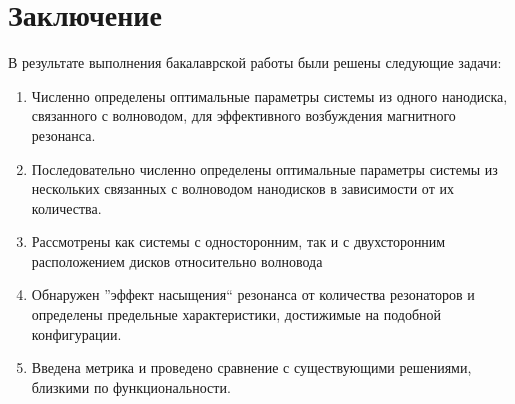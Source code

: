 \chapter{Заключение}

В результате выполнения бакалаврской работы были решены следующие задачи:

\begin{enumerate}[label=\arabic*)]
	\item Численно определены оптимальные параметры системы из одного нанодиска, связанного с волноводом, для эффективного возбуждения магнитного резонанса.
	\item Последовательно численно определены оптимальные параметры системы из нескольких связанных с волноводом нанодисков в зависимости от их количества.
	\item Рассмотрены как системы с односторонним, так и с двухсторонним расположением дисков относительно волновода
	\item Обнаружен ''эффект насыщения`` резонанса от количества резонаторов и определены предельные характеристики, достижимые на подобной конфигурации.
	\item Введена метрика и проведено сравнение с существующими решениями, близкими по функциональности. 
\end{enumerate}